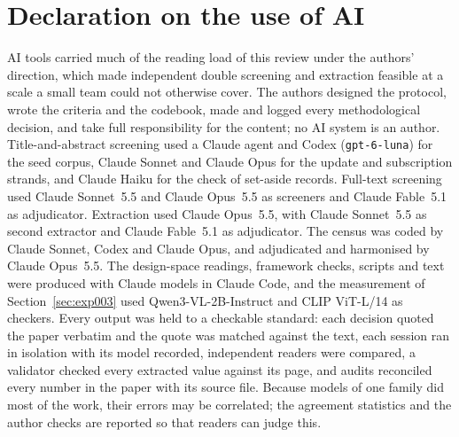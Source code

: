 \documentclass[acmsmall,screen]{acmart}
\begin{document}
\section*{Declaration on the use of AI}
AI tools carried much of the reading load of this review under the authors' direction, which made independent double screening and extraction feasible at a scale a small team could not otherwise cover. The authors designed the protocol, wrote the criteria and the codebook, made and logged every methodological decision, and take full responsibility for the content; no AI system is an author. Title-and-abstract screening used a Claude agent and Codex (\texttt{gpt-6-luna}) for the seed corpus, Claude Sonnet and Claude Opus for the update and subscription strands, and Claude Haiku for the check of set-aside records. Full-text screening used Claude Sonnet~5.5 and Claude Opus~5.5 as screeners and Claude Fable~5.1 as adjudicator. Extraction used Claude Opus~5.5, with Claude Sonnet~5.5 as second extractor and Claude Fable~5.1 as adjudicator. The census was coded by Claude Sonnet, Codex and Claude Opus, and adjudicated and harmonised by Claude Opus~5.5. The design-space readings, framework checks, scripts and text were produced with Claude models in Claude Code, and the measurement of Section~\ref{sec:exp003} used Qwen3-VL-2B-Instruct and CLIP ViT-L/14 as checkers. Every output was held to a checkable standard: each decision quoted the paper verbatim and the quote was matched against the text, each session ran in isolation with its model recorded, independent readers were compared, a validator checked every extracted value against its page, and audits reconciled every number in the paper with its source file. Because models of one family did most of the work, their errors may be correlated; the agreement statistics and the author checks are reported so that readers can judge this. %



\end{document}

